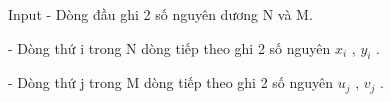Input
- Dòng đầu ghi 2 số nguyên dương N và M.  

   - Dòng thứ i trong N dòng tiếp theo ghi 2 số nguyên $x_{i}$   , $y_{i}$   .  

   - Dòng thứ j trong M dòng tiếp theo ghi 2 số nguyên $u_{j}$   , $v_{j}$   .